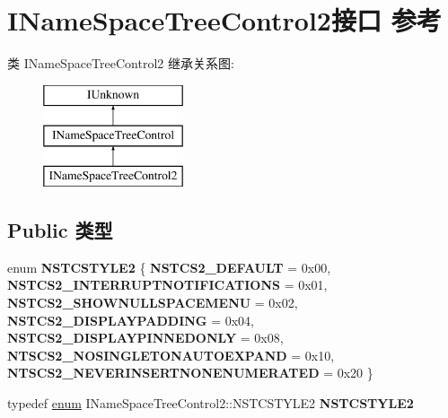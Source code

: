 \hypertarget{interface_i_name_space_tree_control2}{}\section{I\+Name\+Space\+Tree\+Control2接口 参考}
\label{interface_i_name_space_tree_control2}
类 I\+Name\+Space\+Tree\+Control2 继承关系图\+:\begin{figure}[H]
\begin{center}
\leavevmode
\includegraphics[height=3.000000cm]{interface_i_name_space_tree_control2}
\end{center}
\end{figure}
\subsection*{Public 类型}
\begin{DoxyCompactItemize}
\item 
\mbox{\label{interface_i_name_space_tree_control2_a77496785591cc9f57b29f0526fa3c65e}} 
enum {\bfseries N\+S\+T\+C\+S\+T\+Y\+L\+E2} \{ \newline
{\bfseries N\+S\+T\+C\+S2\+\_\+\+D\+E\+F\+A\+U\+LT} = 0x00, 
{\bfseries N\+S\+T\+C\+S2\+\_\+\+I\+N\+T\+E\+R\+R\+U\+P\+T\+N\+O\+T\+I\+F\+I\+C\+A\+T\+I\+O\+NS} = 0x01, 
{\bfseries N\+S\+T\+C\+S2\+\_\+\+S\+H\+O\+W\+N\+U\+L\+L\+S\+P\+A\+C\+E\+M\+E\+NU} = 0x02, 
{\bfseries N\+S\+T\+C\+S2\+\_\+\+D\+I\+S\+P\+L\+A\+Y\+P\+A\+D\+D\+I\+NG} = 0x04, 
\newline
{\bfseries N\+S\+T\+C\+S2\+\_\+\+D\+I\+S\+P\+L\+A\+Y\+P\+I\+N\+N\+E\+D\+O\+N\+LY} = 0x08, 
{\bfseries N\+T\+S\+C\+S2\+\_\+\+N\+O\+S\+I\+N\+G\+L\+E\+T\+O\+N\+A\+U\+T\+O\+E\+X\+P\+A\+ND} = 0x10, 
{\bfseries N\+T\+S\+C\+S2\+\_\+\+N\+E\+V\+E\+R\+I\+N\+S\+E\+R\+T\+N\+O\+N\+E\+N\+U\+M\+E\+R\+A\+T\+ED} = 0x20
 \}
\item 
\mbox{\label{interface_i_name_space_tree_control2_a260c81fbcb527cd9691ac6113461729b}} 
typedef \hyperlink{interfaceenum}{enum} I\+Name\+Space\+Tree\+Control2\+::\+N\+S\+T\+C\+S\+T\+Y\+L\+E2 {\bfseries N\+S\+T\+C\+S\+T\+Y\+L\+E2}
\end{DoxyCompactItemize}
